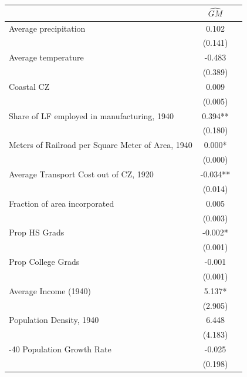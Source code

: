  \begin{tabular}{l*{2}{c}} \toprule
                &\multicolumn{1}{c}{$\widehat{GM}$}\\
\midrule
Average precipitation&    0.102   \\
                &  (0.141)   \\
\addlinespace
Average temperature&   -0.483   \\
                &  (0.389)   \\
\addlinespace
Coastal CZ      &    0.009   \\
                &  (0.005)   \\
\addlinespace
Share of LF employed in manufacturing, 1940&    0.394** \\
                &  (0.180)   \\
\addlinespace
Meters of Railroad per Square Meter of Area, 1940&    0.000*  \\
                &  (0.000)   \\
\addlinespace
Average Transport Cost out of CZ, 1920&   -0.034** \\
                &  (0.014)   \\
\addlinespace
Fraction of area incorporated&    0.005   \\
                &  (0.003)   \\
\addlinespace
Prop HS Grads   &   -0.002*  \\
                &  (0.001)   \\
\addlinespace
Prop College Grads&   -0.001   \\
                &  (0.001)   \\
\addlinespace
Average Income (1940)&    5.137*  \\
                &  (2.905)   \\
\addlinespace
Population Density, 1940&    6.448   \\
                &  (4.183)   \\
\addlinespace
1930-40 Population Growth Rate&   -0.025   \\
                &  (0.198)   \\
       \bottomrule \end{tabular}
